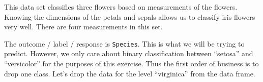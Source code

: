 \documentclass[
]{article}
\newenvironment{Shaded}{\begin{snugshade}}{\end{snugshade}}
\newcommand{\NormalTok}[1]{#1}
\newcommand{\OtherTok}[1]{\textcolor[rgb]{0.56,0.35,0.01}{#1}}
\newcommand{\SpecialCharTok}[1]{\textcolor[rgb]{0.00,0.00,0.00}{#1}}
\newcommand{\StringTok}[1]{\textcolor[rgb]{0.31,0.60,0.02}{#1}}
\begin{document}
This data set classifies three flowers based on measurements of the
flowers. Knowing the dimensions of the petals and sepals allows us to
classify iris flowers very well. There are four measurements in this
set.

The outcome / label / response is \texttt{Species}. This is what we will
be trying to predict. However, we only care about binary classification
between ``setosa'' and ``versicolor'' for the purposes of this exercise.
Thus the first order of business is to drop one class. Let's drop the
data for the level ``virginica'' from the data frame.

\begin{Shaded}
\end{Shaded}
\end{document}
